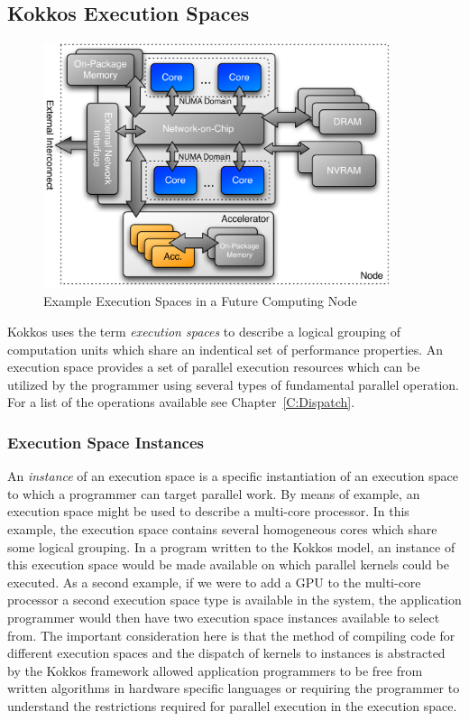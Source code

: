 \subsection{Kokkos Execution Spaces}

\begin{figure}
\begin{center}
\includegraphics[width=4in]{figures/kokkos-execution-space.pdf}
\caption{Example Execution Spaces in a Future Computing Node}
\label{fig:kokkos_execution_spaces}
\end{center}
\end{figure}

Kokkos uses the term {\em execution spaces} to describe a logical
grouping of computation units which share an indentical set of
performance properties. An execution space provides a set of 
parallel execution resources which can be utilized by the
programmer using several types of fundamental parallel
operation. For a list of the operations available see
Chapter~\ref{C:Dispatch}.

\subsubsection{Execution Space Instances}

An {\em instance} of an execution space is a specific instantiation
of an execution space to which a programmer can target parallel
work. By means of example, an execution space might be used
to describe a multi-core processor. In this example, the
execution space contains several homogeneous cores which share
some logical grouping. In a program written to the Kokkos model,
an instance of this execution space would be made available
on which parallel kernels could be executed. As a second example,
if we were to add a GPU to the multi-core processor a second
execution space type is available in the system, the 
application programmer would then have two 
execution space instances available to select from. The
important consideration here is that the method of
compiling code for different execution spaces and the
dispatch of kernels to instances is abstracted by the Kokkos
framework allowed application programmers to be free from 
written algorithms in hardware specific languages or
requiring the programmer to understand the restrictions
required for parallel execution in the execution space.

